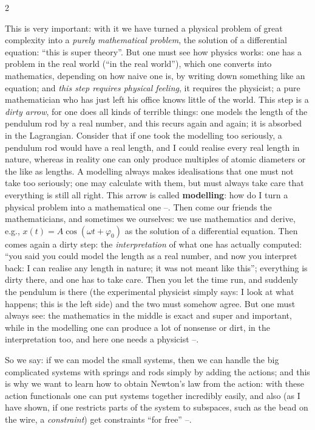 \begin{paracol}{2}
\begin{secondary}\label{sec:lag-modelling}
This is very important: with it we have turned a physical problem of great complexity into a \emph{purely mathematical problem}, the solution of a differential equation: ``this is super theory''. But one must see how physics works: one has a problem in the real world (``in the real world''), which one converts into mathematics, depending on how naive one is, by writing down something like an equation; and \emph{this step requires physical feeling}, it requires the physicist; a pure mathematician who has just left his office knows little of the world. This step is a \emph{dirty arrow}, for one does all kinds of terrible things: one models the length of the pendulum rod by a real number, and this recurs again and again; it is absorbed in the Lagrangian.
Consider that if one took the modelling too seriously, a pendulum rod would have a real length, and I could realise every real length in nature, whereas in reality one can only produce multiples of atomic diameters or the like as lengths. A modelling always makes idealisations that one must not take too seriously; one may calculate with them, but must always take care that everything is still all right. This arrow is called \textbf{modelling}: how do I turn a physical problem into a mathematical one --.
Then come our friends the mathematicians, and sometimes we ourselves: we use mathematics and derive, e.g., $x(t)=A\cos(\omega t+\varphi_0)$ as the solution of a differential equation. Then comes again a dirty step: the \emph{interpretation} of what one has actually computed: ``you said you could model the length as a real number, and now you interpret back: I can realise any length in nature; it was not meant like this''; everything is dirty there, and one has to take care. Then you let the time run, and suddenly the pendulum is there (the experimental physicist simply says: I look at what happens; this is the left side) and the two must somehow agree.
But one must always see: the mathematics in the middle is exact and super and important, while in the modelling one can produce a lot of nonsense or dirt, in the interpretation too, and here one needs a physicist --.
\end{secondary}
So we say: if we can model the small systems, then we can handle the big complicated systems with springs and rods simply by adding the actions; and this is why we want to learn how to obtain Newton's law from the action: with these action functionals one can put systems together incredibly easily, and also (as I have shown, if one restricts parts of the system to subspaces, such as the bead on the wire, a \emph{constraint}) get constraints ``for free'' --.


\end{paracol}
